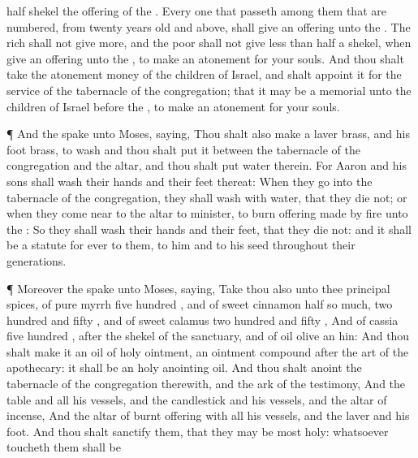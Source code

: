 {half
shekel
{} the
offering of the
{}.
Every one that
passeth among them that are
numbered, from
twenty
years
old and
above, shall
give an
offering unto the
{}.
The
rich shall not give
more, and the
poor shall not give
less than
half a
shekel, when
{}
give an
offering unto the
{}, to make an
atonement for your
souls.
And thou shalt
take the
atonement
money of the
children of
Israel, and shalt
appoint it for the
service of the
tabernacle of the
congregation; that it may be a
memorial unto the
children of
Israel
before the
{}, to make an
atonement for your
souls.
\par }{\PP {}¶ And the
{}
spake unto
Moses,
saying,
Thou shalt also
make a
laver
{}
brass, and his
foot
{}
brass, to
wash
{} and thou shalt
put it between the
tabernacle of the
congregation and the
altar, and thou shalt
put
water therein.
For
Aaron and his
sons shall
wash their
hands and their
feet thereat:
When they
go into the
tabernacle of the
congregation, they shall
wash with
water, that they
die not; or when they come
near to the
altar to
minister, to burn
offering made by
fire unto the
{}:
So they shall
wash their
hands and their
feet, that they
die not: and it shall be a
statute for
ever to them,
{} to him and to his
seed throughout their
generations.
\par }{\PP {}¶ Moreover the
{}
spake unto
Moses,
saying,
Take thou also unto thee
principal
spices, of
pure
myrrh
five
hundred
{}, and of
sweet
cinnamon
half so
much,
{} two
hundred and
fifty
{}, and of
sweet
calamus two
hundred and
fifty
{},
And of
cassia
five
hundred
{}, after the
shekel of the
sanctuary, and of
oil
olive an
hin:
And thou shalt
make it an
oil of
holy
ointment, an
ointment
compound after the
art of the
apothecary: it shall be an
holy
anointing
oil.
And thou shalt
anoint the
tabernacle of the
congregation therewith, and the
ark of the
testimony,
And the
table and all his
vessels, and the
candlestick and his
vessels, and the
altar of
incense,
And the
altar of burnt
offering with all his
vessels, and the
laver and his
foot.
And thou shalt
sanctify them, that they may be
most
holy: whatsoever
toucheth them shall be
}
